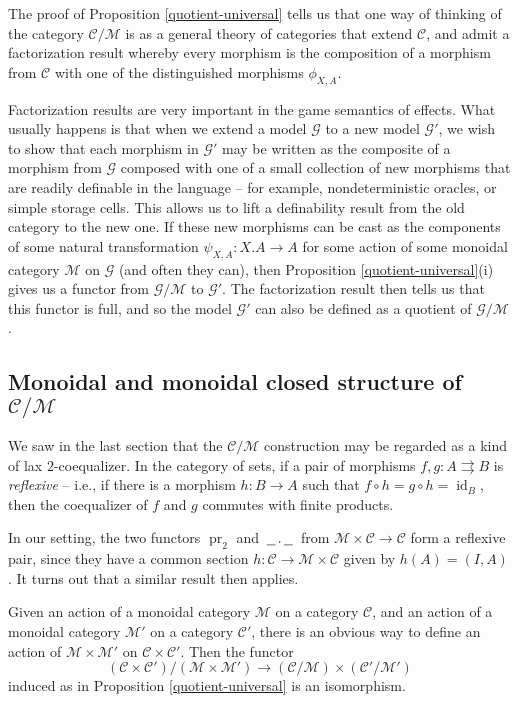 \documentclass{svproc}
\newcommand\C{\mathcal{C}}
\newcommand\G{\mathcal{G}}
\newcommand\M{\mathcal{M}}
\DeclareMathOperator\pr{pr}
\DeclareMathOperator\id{id}
\newcommand*\from{\colon}
\newcommand{\0}{{\mathtt{0}}} \newcommand{\com}{{\mathtt{com}}}
\newcommand{\blank}{\,\underline{\hspace{1.5ex}}\,}
\begin{document}
\begin{remark}
  The proof of Proposition \ref{quotient-universal} tells us that one way of thinking of the category $\C/\M$ is as a general theory of categories that extend $\C$, and admit a factorization result whereby every morphism is the composition of a morphism from $\C$ with one of the distinguished morphisms $\phi_{X,A}$.

  Factorization results are very important in the game semantics of effects.  
  What usually happens is that when we extend a model $\G$ to a new model $\G'$, we wish to show that each morphism in $\G'$ may be written as the composite of a morphism from $\G$ composed with one of a small collection of new morphisms that are readily definable in the language -- for example, nondeterministic oracles, or simple storage cells.  
  This allows us to lift a definability result from the old category to the new one.  
  If these new morphisms can be cast as the components of some natural transformation $\psi_{X,A}\from X.A \to A$ for some action of some monoidal category $\M$ on $\G$ (and often they can), then Proposition \ref{quotient-universal}(i) gives us a functor from $\G/\M$ to $\G'$.  
  The factorization result then tells us that this functor is full, and so the model $\G'$ can also be defined as a quotient of $\G/\M$.
\end{remark}

\subsection{Monoidal and monoidal closed structure of $\C/\M$}

We saw in the last section that the $\C/\M$ construction may be regarded as a kind of lax $2$-coequalizer.  
In the category of sets, if a pair of morphisms $f,g\from A \rightrightarrows B$ is \emph{reflexive} -- i.e., if there is a morphism $h\from B \to A$ such that $f\circ h = g\circ h = \id_B$, then the coequalizer of $f$ and $g$ commutes with finite products.  

In our setting, the two functors $\pr_2$ and $\blank.\blank$ from $\M\times\C \to \C$ form a reflexive pair, since they have a common section $h\from \C \to \M\times \C$ given by $h(A) = (I, A)$.  
It turns out that a similar result then applies.

\begin{proposition}
  Given an action of a monoidal category $\M$ on a category $\C$, and an action of a monoidal category $\M'$ on a category $\C'$, there is an obvious way to define an action of $\M\times\M'$ on $\C\times\C'$.  
  Then the functor
  \[
    (\C\times\C')/(\M\times\M') \to (\C/\M) \times (\C'/\M')
    \]
  induced as in Proposition \ref{quotient-universal} is an isomorphism.
  \label{monoidality}
\end{proposition}
\end{document}
